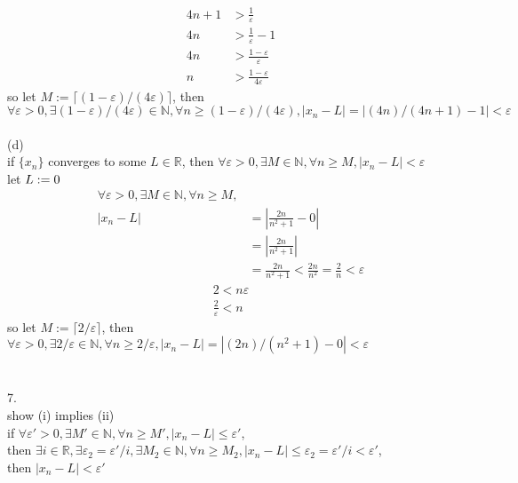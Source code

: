 \documentclass[12pt, border = 4pt, multi]{article} %
\begin{document}
\begin{align*}
4n + 1 &> \frac{1}{\varepsilon}\\
4n &> \frac{1}{\varepsilon} - 1\\
4n &> \frac{1 - \varepsilon}{\varepsilon}\\
n &> \frac{1 - \varepsilon}{4\varepsilon}
\end{align*}
so let $M := \lceil(1 - \varepsilon) / (4\varepsilon)\rceil$, then $\forall \varepsilon > 0, \exists (1 - \varepsilon) / (4\varepsilon) \in \mathbb{N}, \forall n \geq (1 - \varepsilon) / (4\varepsilon), |x_n - L| = |(4n) / (4n + 1) - 1| < \varepsilon$
\\
\\
(d)\\
if $\{x_n\}$ converges to some $L \in \mathbb{R}$, then $\forall \varepsilon > 0, \exists M \in \mathbb{N}, \forall n \geq M, |x_n - L| < \varepsilon$\\
let $L := 0\\$
\begin{align*}
\forall \varepsilon > 0, \exists M \in \mathbb{N}, \forall n \geq M,&\\
|x_n - L| &= \left|\frac{2n}{n ^ 2 + 1} - 0\right|\\
&= \left|\frac{2n}{n ^ 2 + 1}\right|\\
&= \frac{2n}{n ^ 2 + 1} < \frac{2n}{n ^ 2} = \frac{2}{n} < \varepsilon
\end{align*}
\begin{align*}
2 < n\varepsilon\\
\frac{2}{\varepsilon} < n
\end{align*}
so let $M := \lceil 2 / \varepsilon \rceil$, then $\forall \varepsilon > 0, \exists 2 / \varepsilon \in \mathbb{N}, \forall n \geq 2 / \varepsilon, |x_n - L| = |(2n) / (n ^ 2 + 1) - 0| < \varepsilon$\\
\\
\\
7.\\
show (i) implies (ii)\\
if $\forall \varepsilon' > 0, \exists M' \in \mathbb{N}, \forall n \geq M', |x_n - L| \leq \varepsilon'$,\\
then $\exists i \in \mathbb{R}, \exists \varepsilon_2 = \varepsilon' / i, \exists M_2 \in \mathbb{N}, \forall n \geq M_2, |x_n - L| \leq \varepsilon_2 = \varepsilon' / i < \varepsilon'$,\\
then $|x_n - L| < \varepsilon'$\\
\\
\end{document}
